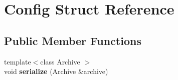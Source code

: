 \hypertarget{struct_config}{}\section{Config Struct Reference}
\label{struct_config}
\subsection*{Public Member Functions}
\begin{DoxyCompactItemize}
\item 
\mbox{\label{struct_config_a6560ae9655561816392af7c0fbabc75e}} 
{\footnotesize template$<$class Archive $>$ }\\void {\bfseries serialize} (Archive \&archive)
\end{DoxyCompactItemize}
